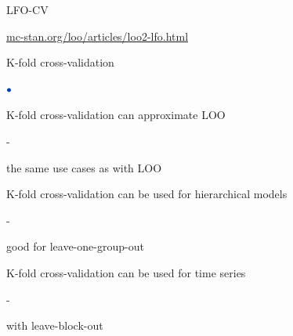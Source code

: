 \documentclass[english,t]{beamer}
\newenvironment{list1}{
   \begin{list}{$\color{list1}\bullet$}{\itemsep=6pt}}{
  \end{list}}
\newenvironment{list2}{
  \begin{list}{-}{\baselineskip=12pt\itemsep=2pt}}{
  \end{list}}
\begin{document}
\begin{frame}{LFO-CV}


  \vspace{2\baselineskip}
   {\small \url{mc-stan.org/loo/articles/loo2-lfo.html}}

  
\end{frame}

\begin{frame}{K-fold cross-validation}

\begin{list1}
\item K-fold cross-validation can approximate LOO
  \begin{list2}
    \item the same use cases as with LOO
  \end{list2}
\item K-fold cross-validation can be used for hierarchical models
  \begin{list2}
    \item good for leave-one-group-out
  \end{list2}
\item K-fold cross-validation can be used for time series
  \begin{list2}
    \item with leave-block-out
  \end{list2}
\end{list1}

\end{frame}

\begin{frame}{}

  \\
  
\end{frame}
\end{document}
